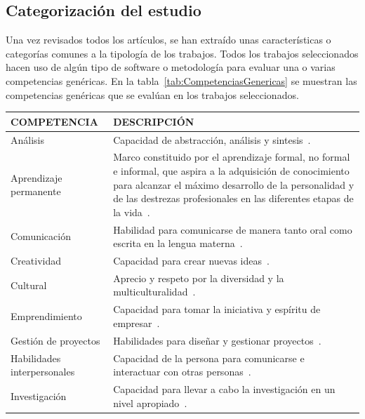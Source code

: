 \subsection{Categorización del estudio}

Una vez revisados todos los artículos, se han extraído unas características o categorías comunes a la tipología de los trabajos. Todos los trabajos seleccionados hacen uso de algún tipo de software o metodología para evaluar una o varias competencias genéricas. En la tabla~\ref{tab:CompetenciasGenericas} se muestran las competencias genéricas que se evalúan en los trabajos seleccionados.


\pagestyle{empty}
\begin{landscape}
  \begin{center}
\begin{longtable}{| m{6cm} | m{16cm} |}
    \hline
    COMPETENCIA & DESCRIPCIÓN \\
    \hline
    \hline
    Análisis & Capacidad de abstracción, análisis y sintesis~\cite{gonzalez2003tuning}.\\
    \hline
    Aprendizaje permanente & Marco constituido por el aprendizaje formal, no formal e informal, que aspira a la adquisición de conocimiento para alcanzar el máximo desarrollo de la personalidad y de las destrezas profesionales en las diferentes etapas de la vida~\cite{bernheim2010educacion}. \\
    \hline
    Comunicación & Habilidad para comunicarse de manera tanto oral como escrita en la lengua materna~\cite{gonzalez2003tuning}. \\
    \hline
    Creatividad & Capacidad para crear nuevas ideas~\cite{gonzalez2003tuning}. \\
    \hline
    Cultural & Aprecio y respeto por la diversidad y la multiculturalidad~\cite{gonzalez2003tuning}. \\
    \hline
    Emprendimiento & Capacidad para tomar la iniciativa y espíritu de empresar~\cite{gonzalez2003tuning}. \\
    \hline
    Gestión de proyectos & Habilidades para diseñar y gestionar proyectos~\cite{gonzalez2003tuning}. \\
    \hline
    Habilidades interpersonales & Capacidad de la persona para comunicarse e interactuar con otras personas~\cite{gonzalez2003tuning}. \\ %
    \hline    
    Investigación & Capacidad para llevar a cabo la investigación en un nivel apropiado~\cite{gonzalez2003tuning}.  \\

\end{longtable}
\end{center}
\end{landscape}
